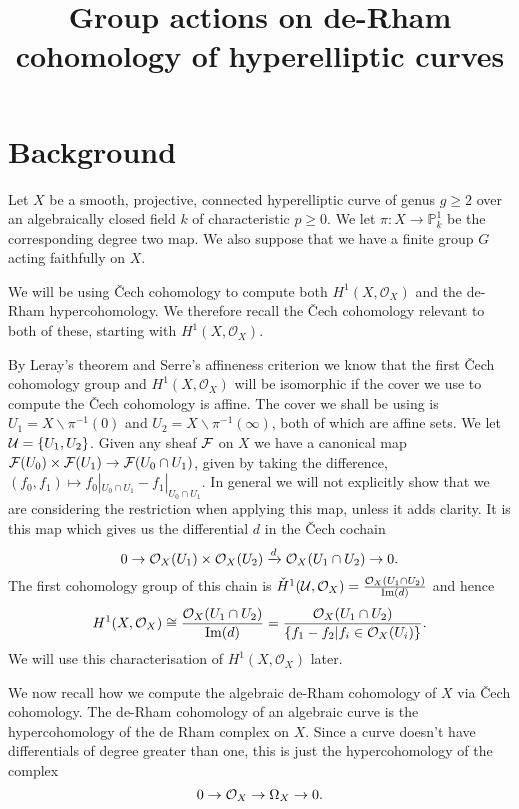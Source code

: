 \documentclass[draft, 11pt]{article} %
\title{Group actions on de-Rham cohomology of hyperelliptic curves}
\author{}
\theoremstyle{plain}
\theoremstyle{remark}
\newcommand{\cO}{{\cal O}}
\newcommand{\cech}{\v{C}ech }
\newcommand{\hone}{H^1(X,\mathcal{O}_X)}
\newcommand{\cechhone}{\check{H}^1(\mathcal U,\mathcal O_X)}
\DeclareMathOperator{\Ima}{Im}
\begin{document}
\maketitle

\section{Background}

Let $X$ be a smooth, projective, connected hyperelliptic curve of genus $g \geq 2$ over an algebraically closed field $k$ of characteristic $p \geq 0$.
We let $\pi \colon X \rightarrow \mathbb P_k^1$ be the corresponding degree two map.
We also suppose that we have a finite group $G$ acting faithfully on $X$.

We will be using \cech cohomology to compute both $\hone$ and the de-Rham hypercohomology.
We therefore recall the \cech cohomology relevant to both of these, starting with $\hone$.

By Leray's theorem \cite[Thm 5.2.12]{liu} and Serre's affineness criterion \cite[Thm 5.2.23]{liu} we know that the first \cech cohomology group and $\hone$ will be isomorphic if the cover we use to compute the \cech cohomology is affine.
The cover we shall be using is $U_1 = X\backslash \pi^{-1}(0)$ and $U_2 = X\backslash  \pi^{-1}(\infty) $, both of which are affine sets.
We let ${\cal U} = \{ U_1, U_2\}$.
Given any sheaf $\cal F$ on $X$ we have a canonical map ${\cal F}(U_0) \times {\cal F} (U_1) \rightarrow {\cal F}(U_0 \cap U_1)$, given by taking the difference, $(f_0,f_1) \mapsto f_0|_{U_0 \cap U_1} - f_1|_{U_0 \cap U_1}$.
In general we will not explicitly show that we are considering the restriction when applying this map, unless it adds clarity.
It is this map which gives us the differential $d$ in the \cech cochain
\begin{equation*}
0 \rightarrow \cO_X(U_1)\times \cO_X(U_2) \xrightarrow{d} \cO_X(U_1 \cap U_2) \rightarrow 0.
\end{equation*}
The first cohomology group of this chain is $\cechhone = \frac{\cO_X(U_1 \cap U_2)}{\Ima(d)}$ and hence
\begin{equation}
\hone \cong \frac{\cO_X(U_1 \cap U_2)}{\Ima(d)}  
 = \frac{\cO_X(U_1 \cap U_2)}{\{f_1 - f_2 | f_i \in \cO_X(U_i) \}}.
\end{equation}
We will use this characterisation of $\hone$ later.

We now recall how we compute the algebraic de-Rham cohomology of $X$ via \cech cohomology.
The de-Rham cohomology of an algebraic curve is the hypercohomology of the de Rham complex on $X$. 
Since a curve doesn't have differentials of degree greater than one, this is just the hypercohomology of the complex
\begin{equation}\label{res}
0 \rightarrow \cO_X \rightarrow \Omega_X \rightarrow 0.
\end{equation}
\end{document}
